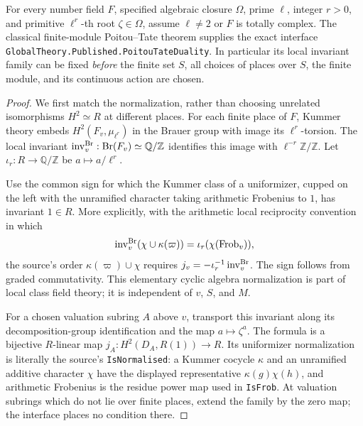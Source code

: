 \begin{proposition}
\label{prop:ld-poitou-tate}
For every number field $F$, specified algebraic closure $\Omega$,
prime $\ell$, integer $r>0$, and primitive $\ell^r$-th root
$\zeta\in\Omega$, assume $\ell\ne2$ or $F$ is totally complex.
The classical finite-module Poitou--Tate theorem supplies the exact
interface \texttt{GlobalTheory.Published.PoitouTateDuality}.
In particular its local invariant family can be fixed \emph{before}
the finite set $S$, all choices of places over $S$, the finite module,
and its continuous action are chosen.
\end{proposition}

\begin{proof}
We first match the normalization, rather than choosing unrelated
isomorphisms $H^2\simeq R$ at different places.  For each finite place
of $F$, Kummer theory embeds $H^2(F_v,\mu_{\ell^r})$ in the Brauer
group with image its $\ell^r$-torsion.  The local invariant
$\operatorname{inv}^{\rm Br}_v:\operatorname{Br}(F_v)\simeq
\mathbb Q/\mathbb Z$ identifies this image with
$\ell^{-r}\mathbb Z/\mathbb Z$.  Let
$\iota_r:R\to\mathbb Q/\mathbb Z$ be
$a\mapsto a/\ell^r$.

Use the common sign for which the Kummer class of a uniformizer,
cupped on the left with the unramified character taking arithmetic
Frobenius to $1$, has invariant $1\in R$.  More explicitly, with the
arithmetic local reciprocity convention in which
\[
 \operatorname{inv}^{\rm Br}_v(\chi\cup\kappa(\varpi))
       =\iota_r(\chi(\operatorname{Frob}_v)),
\]
the source's order $\kappa(\varpi)\cup\chi$ requires
$j_v=-\iota_r^{-1}\operatorname{inv}^{\rm Br}_v$.
The sign follows from graded commutativity.  This elementary cyclic
algebra normalization is part of local class field theory; it is
independent of $v$, $S$, and $M$.

For a chosen valuation subring $A$ above $v$, transport this invariant
along its decomposition-group identification and the map
$a\mapsto\zeta^a$.  The formula is a bijective $R$-linear map
$j_A:H^2(D_A,R(1))\to R$.  Its uniformizer normalization is literally
the source's \texttt{IsNormalised}: a Kummer cocycle $\kappa$ and an
unramified additive character $\chi$ have the displayed representative
$\kappa(g)\chi(h)$, and arithmetic Frobenius is the residue power
map used in \texttt{IsFrob}.  At valuation subrings which do not lie
over finite places, extend the family by the zero map; the interface
places no condition there.


\end{proof}
